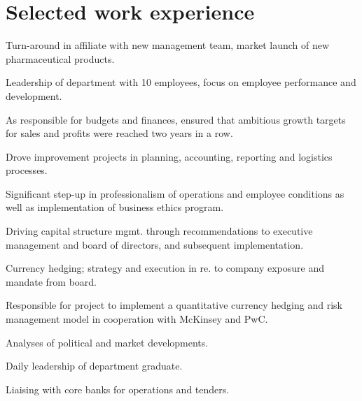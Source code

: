 \documentclass[a4paper]{janus-resume}
\begin{document}
\hfill
%
%
\begin{minipage}[t]{0.49\textwidth} %


\section{Selected work experience}


\vspace{\topsep} %
\begin{tightitemize}
\item Turn-around in affiliate with new management team, market launch of new pharmaceutical products.
\item Leadership of department with 10 employees, focus on employee performance and development.
\item As responsible for budgets and finances, ensured that ambitious growth targets for sales and profits were reached two years in a row.
\item Drove improvement projects in planning, accounting, reporting and logistics processes.
\item Significant step-up in professionalism of operations and employee conditions as well as implementation of business ethics program. 
\end{tightitemize}

\sectionspace %



\begin{tightitemize}
\item Driving capital structure mgmt. through recommendations to executive management and board of directors, and subsequent implementation.
\item Currency hedging; strategy and execution in re. to company exposure and mandate from board.
\item Responsible for project to implement a quantitative currency hedging and risk management model in cooperation with McKinsey and PwC. 
\item Analyses of political and market developments.
\item Daily leadership of department graduate.
\item Liaising with core banks for operations and tenders.
\end{tightitemize}


\end{minipage}
\end{document}

